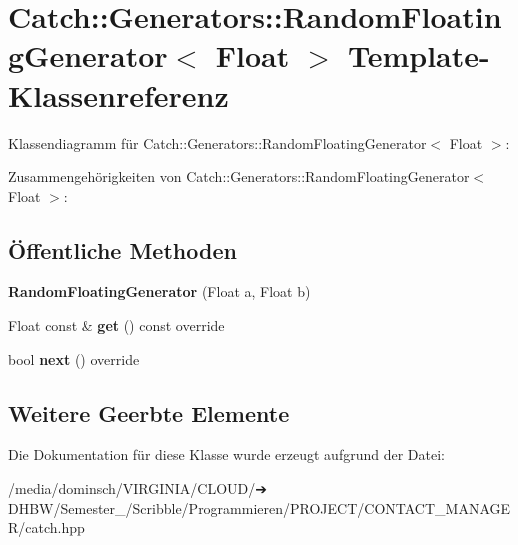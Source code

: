 \hypertarget{classCatch_1_1Generators_1_1RandomFloatingGenerator}{}\section{Catch\+:\+:Generators\+:\+:Random\+Floating\+Generator$<$ Float $>$ Template-\/\+Klassenreferenz}
\label{classCatch_1_1Generators_1_1RandomFloatingGenerator}


Klassendiagramm für Catch\+:\+:Generators\+:\+:Random\+Floating\+Generator$<$ Float $>$\+:


Zusammengehörigkeiten von Catch\+:\+:Generators\+:\+:Random\+Floating\+Generator$<$ Float $>$\+:
\subsection*{Öffentliche Methoden}
\begin{DoxyCompactItemize}
\item 
\mbox{\label{classCatch_1_1Generators_1_1RandomFloatingGenerator_abce275ce88f7c3465addd7a98b6c408d}} 
{\bfseries Random\+Floating\+Generator} (Float a, Float b)
\item 
\mbox{\label{classCatch_1_1Generators_1_1RandomFloatingGenerator_a0dea6fa1f9e2647df022f0b588cf0a8f}} 
Float const  \& {\bfseries get} () const override
\item 
\mbox{\label{classCatch_1_1Generators_1_1RandomFloatingGenerator_a6a65e5f16abd884f58c31581b2a0d6db}} 
bool {\bfseries next} () override
\end{DoxyCompactItemize}
\subsection*{Weitere Geerbte Elemente}


Die Dokumentation für diese Klasse wurde erzeugt aufgrund der Datei\+:\begin{DoxyCompactItemize}
\item 
/media/dominsch/\+V\+I\+R\+G\+I\+N\+I\+A/\+C\+L\+O\+U\+D/➔ D\+H\+B\+W/\+Semester\+\_/\+Scribble/\+Programmieren/\+P\+R\+O\+J\+E\+C\+T/\+C\+O\+N\+T\+A\+C\+T\+\_\+\+M\+A\+N\+A\+G\+E\+R/catch.\+hpp\end{DoxyCompactItemize}
